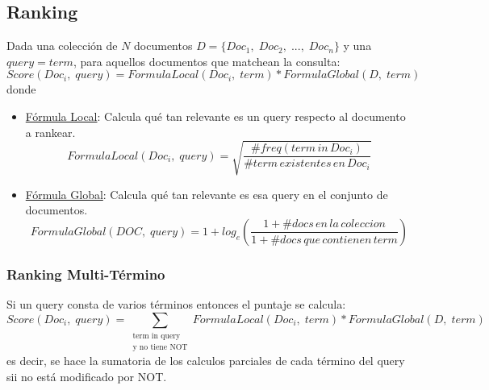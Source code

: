 \documentclass{article}
\newcommand{\comma}{,\;}
\begin{document}
\subsection{Ranking}
Dada una colección de $N$ documentos $D = \{ Doc_1 \comma Doc_2 \comma  ... \comma Doc_n \}$ y una $query = term$, para aquellos documentos que matchean la consulta:
\begin{equation*}
    Score(Doc_i \comma query) = FormulaLocal(Doc_i \comma term) * FormulaGlobal(D \comma term)
\end{equation*}
donde
\begin{itemize}
    \item \underline{Fórmula Local}: Calcula qué tan relevante es un query respecto al documento a rankear.
    \begin{equation*}
        FormulaLocal(Doc_i \comma query) = \sqrt{\frac{\#freq(term \, in \, Doc_i)}{\#term \, existentes \, en \, Doc_i}}
    \end{equation*}
    \item  \underline{Fórmula Global}: Calcula qué tan relevante es esa query en el conjunto de documentos. 
    \begin{equation*}
        FormulaGlobal(DOC \comma query) = 1 + log_e\left(\frac{1 + \#docs \, en \, la \, coleccion}{1 + \#docs \, que \, contienen \, term}\right)
    \end{equation*}
\end{itemize}

\subsubsection*{Ranking Multi-Término}
Si un query consta de varios términos entonces el puntaje se calcula:
\begin{equation*}
    Score(Doc_i \comma query) = \sum_{\substack{\text{term in query}\\ \text{y no tiene NOT}}} FormulaLocal(Doc_i \comma term) * FormulaGlobal(D \comma term)
\end{equation*}
es decir, se hace la sumatoria de los calculos parciales de cada término del query sii no está modificado por NOT.

\newpage
\end{document}
